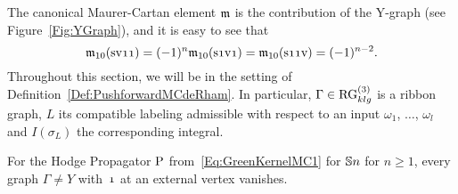 \documentclass[\MainFolder/Text.tex]{subfiles}
\begin{document}
The canonical Maurer-Cartan element $\mathfrak{m}$ is the contribution of the Y-graph (see Figure~\ref{Fig:YGraph}), and it is easy to see that
\begin{equation*}
 \MC_{10}(\Susp \NVol \NOne \NOne ) = (-1)^n \MC_{10}(\Susp\NOne \NVol \NOne) = \MC_{10}(\Susp \NOne \NOne \NVol) = (-1)^{n-2}.
\end{equation*}
Throughout this section, we will be in the setting of Definition~\ref{Def:PushforwardMCdeRham}.
In particular, $\Gamma \in \mathrm{RG}^{(3)}_{klg}$ is a ribbon graph, $L$ its compatible labeling admissible with respect to an input $\omega_1$, $\dotsc$, $\omega_l$ and $I(\sigma_L)$ the corresponding integral.
\begin{Lemma} \label{Lemma:ABVanishing}
For the Hodge Propagator $\mathrm{P}$ from~\eqref{Eq:GreenKernelMC1} for $\mathbb{S}{n}$ for $n\ge 1$, every graph $\Gamma \neq Y$ with~$\NOne$ at an external vertex vanishes.
\end{Lemma}
\end{document}

